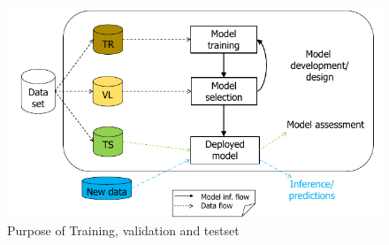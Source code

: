 	\begin{figure}
	    \caption{Purpose of Training, validation and testset}
	    \label{img:dataset}
	    \includegraphics[width=\textwidth]{images/dataSet}
	\end{figure}


